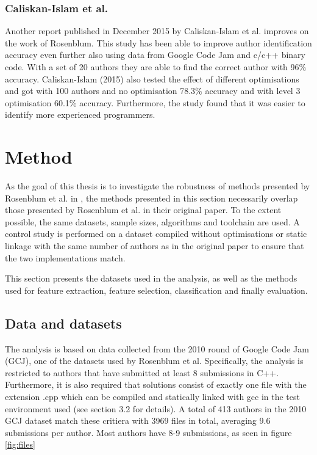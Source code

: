 \documentclass[a4paper,11pt]{kth-mag}
\begin{document}
\subsection{Caliskan-Islam et al.}
Another report published in December 2015 by Caliskan-Islam et al. improves on
the work of Rosenblum. This study has been able to improve author
identification accuracy even further also using data from Google Code Jam and
c/c++ binary code. With a set of 20 authors they are able to find the correct
author with 96\% accuracy. Caliskan-Islam (2015) also tested the effect of
different optimisations and got with 100 authors and no optimisation 78.3\%
accuracy and with level 3 optimisation 60.1\% accuracy. Furthermore, the study
found that it was easier to identify more experienced programmers.

\chapter{Method} \label{ch:method}
As the goal of this thesis is to investigate the robustness of methods
presented by Rosenblum et al. in \parencite{rosenblum2011wrote}, the methods
presented in this section necessarily overlap those presented by Rosenblum et
al. in their original paper. To the extent possible, the same datasets, sample
sizes, algorithms and toolchain are used. A control study is performed on a
dataset compiled without optimisations or static linkage with the same number
of authors as in the original paper to ensure that the two implementations
match. 

This section presents the datasets used in the analysis, as well as the methods
used for feature extraction, feature selection, classification and finally
evaluation.

\section{Data and datasets} \label{data-datasets}
The analysis is based on data collected from the 2010 round of Google Code Jam
(GCJ), one of the datasets used by Rosenblum et al. Specifically, the analysis
is restricted to authors that have submitted at least 8 submissions in C++.
Furthermore, it is also required that solutions consist of exactly one file
with the extension .cpp which can be compiled and statically linked with gcc in
the test environment used (see section 3.2 for details). A total of 413 authors
in the 2010 GCJ dataset match these critiera with 3969 files in total,
averaging 9.6 submissions per author. Most authors have 8-9 submissions, as
seen in figure \ref{fig:files} 
\end{document}
